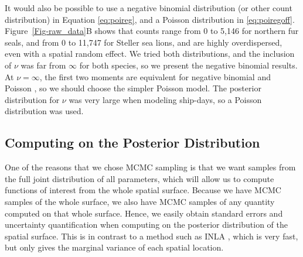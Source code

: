 \documentclass[11pt, titlepage]{article}
\begin{document}
\begin{spacing}{1.9}
\begin{flushleft}
It would also be possible to use a negative binomial distribution (or other count distribution) in Equation \eqref{eq:poireg}, and a Poisson distribution in  \eqref{eq:poiregoff}. Figure~\ref{Fig-raw_data}B shows that counts range from 0 to 5,146 for northern fur seals, and from 0 to 11,747 for Steller sea lions, and are highly overdispersed, even with a spatial random effect.  We tried both distributions, and the inclusion of $\nu$ was far from $\infty$ for both species, so we present the negative binomial results. At $\nu = \infty$, the first two moments are equivalent for negative binomial and Poisson \citep{VerHoefEtAl2007QuasiPoissonvsnegative2766}, so we should choose the simpler Poisson model.  The posterior distribution for $\nu$ was very large when modeling ship-days, so a Poisson distribution was used.


\subsection{Computing on the Posterior Distribution}

One of the reasons that we chose MCMC sampling is that we want samples from the full joint distribution of all parameters, which will allow us to compute functions of interest from the whole spatial surface.  Because we have MCMC samples of the whole surface, we also have MCMC samples of any quantity computed on that whole surface.  Hence, we easily obtain standard errors and uncertainty quantification when computing on the posterior distribution of the spatial surface.  This is in contrast to a method such as INLA \citep{rue_approximate_2009}, which is very fast, but only gives the marginal variance of each spatial location.  


\end{flushleft}
\end{spacing}
\end{document}
